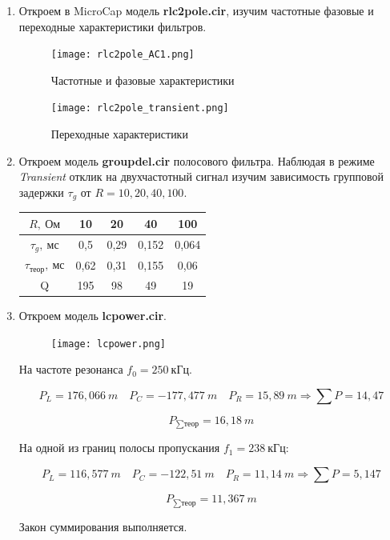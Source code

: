 \documentclass[a4paper, 12pt]{article}%
\begin{document}
\begin{enumerate}
\item Откроем в MicroCap модель \textbf{rlc2pole.cir}, изучим частотные фазовые и переходные характеристики фильтров.

\begin{figure}[h!]
\centering
\texttt{[image: rlc2pole\_AC1.png]}
\label{fig:Image1}
\caption{Частотные и фазовые характеристики}
\end{figure}

\begin{figure}[h!]
\centering
\texttt{[image: rlc2pole\_transient.png]}
\label{fig:Image1}
\caption{Переходные характеристики}
\end{figure}

\item Откроем модель \textbf{groupdel.cir} полосового фильтра. Наблюдая в режиме \textit{Transient} отклик на двухчастотный сигнал изучим зависимость групповой задержки $\tau_g$ от $R = 10, 20, 40, 100$.

\begin{center}
\begin{tabular}{|c|c|c|c|c|}
\hline
$R, \: \textit{Ом}$ & 10 & 20 & 40 & 100 \\
\hline
$\tau_g, \: \textit{мс}$ & 0,5 & 0,29 & 0,152 & 0,064 \\
\hline
$\tau_{\textit{теор}}, \: \textit{мс}$ & 0,62 & 0,31 & 0,155 & 0,06 \\
\hline
Q & 195 & 98 & 49 & 19 \\
\hline
\end{tabular}
\end{center}

\item Откроем модель \textbf{lcpower.cir}.

\begin{figure}[h!]
\centering
\texttt{[image: lcpower.png]}
\label{fig:Image1}
\end{figure}

На частоте резонанса $f_0 = 250 \: \textit{кГц}$.

\[P_L = 176,066 \: m \quad P_C = -177,477 \: m \quad P_R = 15,89 \: m \Rightarrow \sum P = 14,47\]

\[P_{\sum \textit{теор}} = 16,18 \: m\]

На одной из границ полосы пропускания $f_1 = 238 \: \textit{кГц}$:

\[P_L = 116,577 \: m \quad P_C = -122,51 \: m \quad P_R = 11,14 \: m \Rightarrow \sum P = 5,147\]

\[P_{\sum \textit{теор}} = 11,367 \: m\]

Закон суммирования выполняется.

\end{enumerate}
\end{document}

